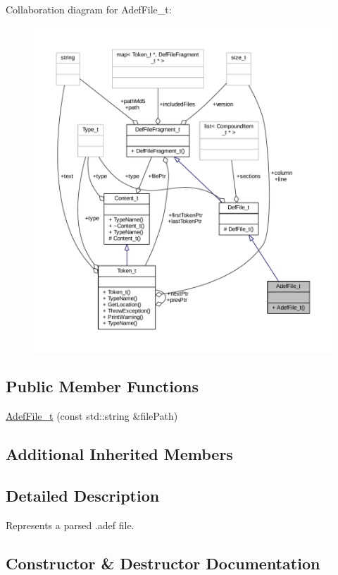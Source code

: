 Collaboration diagram for Adef\+File\+\_\+t\+:
\nopagebreak
\begin{figure}[H]
\begin{center}
\leavevmode
\includegraphics[width=350pt]{struct_adef_file__t__coll__graph}
\end{center}
\end{figure}
\subsection*{Public Member Functions}
\begin{DoxyCompactItemize}
\item 
\hyperlink{struct_adef_file__t_a8f8b5ee90669342598ee85841465ca8b}{Adef\+File\+\_\+t} (const std\+::string \&file\+Path)
\end{DoxyCompactItemize}
\subsection*{Additional Inherited Members}


\subsection{Detailed Description}
Represents a parsed .adef file. 

\subsection{Constructor \& Destructor Documentation}
